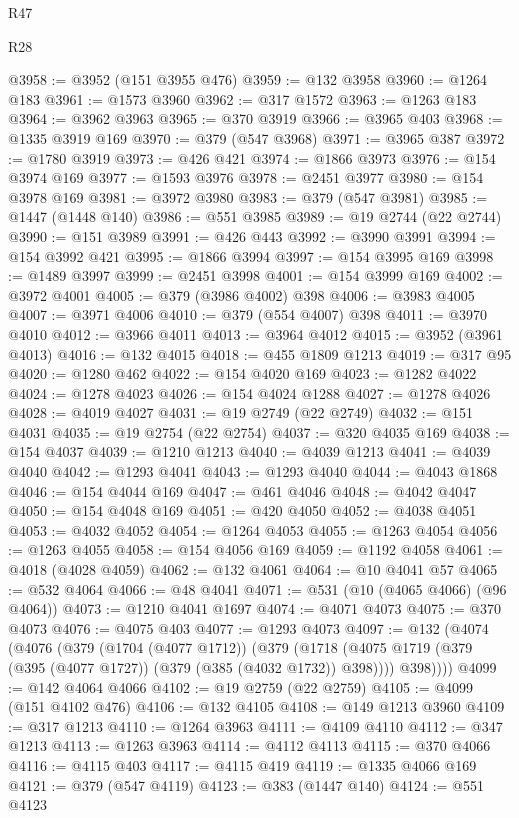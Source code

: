 \begin{lexlean}{R47}
\begin{lexlean}{R28}
\begin{coremodule}
{{{{{{{{{{{{{{{{{{{{{{{{{{{{{{{{{{{{{{{{{{{{{{{{{{{{{{{{{{{{{{{{{{{{{{{{{{{{{{{{{{{{{{{{{{{{{{{{{{{{{{{{{{{{{{{{{{{{{{{{{{{{{{{{{{{{{@3958 := @3952 (@151 @3955 @476)
@3959 := @132 @3958
@3960 := @1264 @183
@3961 := @1573 @3960
@3962 := @317 @1572
@3963 := @1263 @183
@3964 := @3962 @3963
@3965 := @370 @3919
@3966 := @3965 @403
@3968 := @1335 @3919 @169
@3970 := @379 (@547 @3968)
@3971 := @3965 @387
@3972 := @1780 @3919
@3973 := @426 @421
@3974 := @1866 @3973
@3976 := @154 @3974 @169
@3977 := @1593 @3976
@3978 := @2451 @3977
@3980 := @154 @3978 @169
@3981 := @3972 @3980
@3983 := @379 (@547 @3981)
@3985 := @1447 (@1448 @140)
@3986 := @551 @3985
@3989 := @19 @2744 (@22 @2744)
@3990 := @151 @3989
@3991 := @426 @443
@3992 := @3990 @3991
@3994 := @154 @3992 @421
@3995 := @1866 @3994
@3997 := @154 @3995 @169
@3998 := @1489 @3997
@3999 := @2451 @3998
@4001 := @154 @3999 @169
@4002 := @3972 @4001
@4005 := @379 (@3986 @4002) @398
@4006 := @3983 @4005
@4007 := @3971 @4006
@4010 := @379 (@554 @4007) @398
@4011 := @3970 @4010
@4012 := @3966 @4011
@4013 := @3964 @4012
@4015 := @3952 (@3961 @4013)
@4016 := @132 @4015
@4018 := @455 @1809 @1213
@4019 := @317 @95
@4020 := @1280 @462
@4022 := @154 @4020 @169
@4023 := @1282 @4022
@4024 := @1278 @4023
@4026 := @154 @4024 @1288
@4027 := @1278 @4026
@4028 := @4019 @4027
@4031 := @19 @2749 (@22 @2749)
@4032 := @151 @4031
@4035 := @19 @2754 (@22 @2754)
@4037 := @320 @4035 @169
@4038 := @154 @4037
@4039 := @1210 @1213
@4040 := @4039 @1213
@4041 := @4039 @4040
@4042 := @1293 @4041
@4043 := @1293 @4040
@4044 := @4043 @1868
@4046 := @154 @4044 @169
@4047 := @461 @4046
@4048 := @4042 @4047
@4050 := @154 @4048 @169
@4051 := @420 @4050
@4052 := @4038 @4051
@4053 := @4032 @4052
@4054 := @1264 @4053
@4055 := @1263 @4054
@4056 := @1263 @4055
@4058 := @154 @4056 @169
@4059 := @1192 @4058
@4061 := @4018 (@4028 @4059)
@4062 := @132 @4061
@4064 := @10 @4041 @57
@4065 := @532 @4064
@4066 := @48 @4041
@4071 := @531 (@10 (@4065 @4066) (@96 @4064))
@4073 := @1210 @4041 @1697
@4074 := @4071 @4073
@4075 := @370 @4073
@4076 := @4075 @403
@4077 := @1293 @4073
@4097 := @132
    (@4074
      (@4076
        (@379
          (@1704 (@4077 @1712))
          (@379
            (@1718 (@4075 @1719 (@379 (@395 (@4077 @1727)) (@379 (@385 (@4032 @1732)) @398))))
            @398))))
@4099 := @142 @4064 @4066
@4102 := @19 @2759 (@22 @2759)
@4105 := @4099 (@151 @4102 @476)
@4106 := @132 @4105
@4108 := @149 @1213 @3960
@4109 := @317 @1213
@4110 := @1264 @3963
@4111 := @4109 @4110
@4112 := @347 @1213
@4113 := @1263 @3963
@4114 := @4112 @4113
@4115 := @370 @4066
@4116 := @4115 @403
@4117 := @4115 @419
@4119 := @1335 @4066 @169
@4121 := @379 (@547 @4119)
@4123 := @383 (@1447 @140)
@4124 := @551 @4123
}}}}}}}}}}}}}}}}}}}}}}}}}}}}}}}}}}}}}}}}}}}}}}}}}}}}}}}}}}}}}}}}}}}}}}}}}}}}}}}}}}}}}}}}}}}}}}}}}}}}}}}}}}}}}}}}}}}}}}}}}}}}}}}}}}}}}
\end{coremodule}
\end{lexlean}
\end{lexlean}
